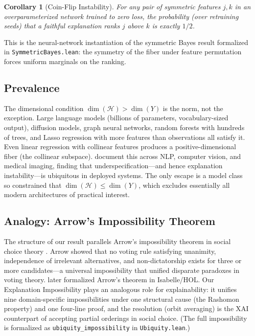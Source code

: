 \documentclass[11pt,a4paper]{article}
\newtheorem{corollary}[theorem]{Corollary}
\newcommand{\sH}{\mathcal{H}}
\begin{document}
\begin{corollary}[Coin-Flip Instability]
\label{cor:coin-flip}
For any pair of symmetric features $j, k$ in an overparameterized network
trained to zero loss, the probability (over retraining seeds) that a
faithful explanation ranks $j$ above $k$ is exactly $1/2$.
\end{corollary}

\noindent
This is the neural-network instantiation of the symmetric Bayes
result formalized in \texttt{Symmetric\-Bayes.lean}: the symmetry
of the fiber under feature permutation forces uniform marginals on
the ranking.

\subsection{Prevalence}
\label{sec:prevalence}

The dimensional condition $\dim(\sH) > \dim(Y)$ is the norm, not the
exception.  Large language models (billions of parameters, vocabulary-sized
output), diffusion models, graph neural networks, random forests with
hundreds of trees, and Lasso regression with more features than observations
all satisfy it.  Even linear regression with collinear features produces a
positive-dimensional fiber (the collinear subspace).
\citet{damour2022underspecification} document this across NLP,
computer vision, and medical imaging, finding that
underspecification---and hence explanation instability---is ubiquitous
in deployed systems.  The only escape is a model class so constrained
that $\dim(\sH) \leq \dim(Y)$, which excludes essentially all modern
architectures of practical interest.

\subsection{Analogy: Arrow's Impossibility Theorem}
\label{sec:arrow-analogy}

The structure of our result parallels Arrow's impossibility theorem in social
choice theory \citep{arrow1951social}.  Arrow showed that no voting rule
satisfying unanimity, independence of irrelevant alternatives, and
non-dictatorship exists for three or more candidates---a universal
impossibility that unified disparate paradoxes in voting theory.
\citet{nipkow2009social} later formalized Arrow's theorem in Isabelle/HOL.
Our Explanation Impossibility plays an analogous role for
explainability: it unifies nine domain-specific impossibilities under one
structural cause (the Rashomon property) and one four-line proof, and the
resolution (orbit averaging) is the XAI counterpart of accepting partial
orderings in social choice.
(The full impossibility is formalized as \texttt{ubiquity\_impossibility}
in \texttt{Ubiquity.lean}.)
\end{document}
